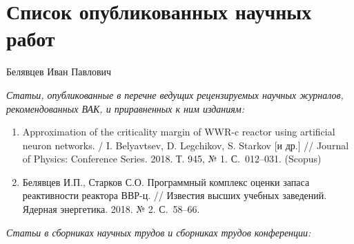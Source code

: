\documentclass[a4paper,12pt]{extreport}
\begin{document}
    \centering

    \section*{Список опубликованных научных работ}

    {Белявцев Иван Павлович}

    {\it Статьи, опубликованные в перечне ведущих рецензируемых научных журналов, рекомендованных ВАК, и приравненных к ним изданиям:}

\begin{enumerate}
    \item Approximation of the criticality margin of WWR-c reactor using artificial neuron networks. / I. Belyavtsev, D. Legchikov, S. Starkov [и др.] // Journal of Physics: Conference Series. 2018. Т. 945, № 1. С.~012–031. (Scopus)
    \item Белявцев И.П., Старков С.О. Программный комплекс оценки запаса реактивности реактора ВВР-ц. // Известия высших учебных заведений. Ядерная энергетика. 2018. № 2. С.~58–66.
\end{enumerate}

{\it Статьи в сборниках научных трудов и сборниках трудов конференции:}
\end{document}
